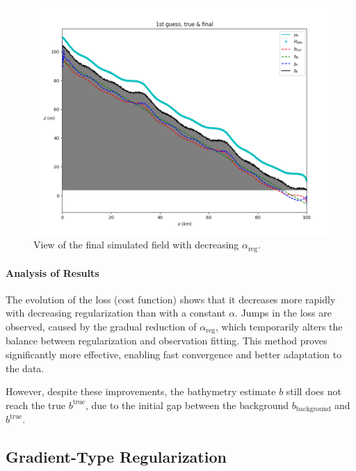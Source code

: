 \documentclass{article}
\begin{document}
\begin{figure}[H]
    \vspace{0.5cm}
    
    \begin{minipage}[b]{0.8\linewidth}
        \centering
        \includegraphics[width=\linewidth]{Images_Ayoub/With_Regularisation/Decreasing_Alpha/Viwe.png}
        \caption{View of the final simulated field with decreasing \( \alpha_{\text{reg}} \).}
        \label{fig:dec-view}
    \end{minipage}
\end{figure}

\paragraph{Analysis of Results}
The evolution of the loss (cost function) shows that it decreases more rapidly with decreasing regularization than with a constant \( \alpha \). Jumps in the loss are observed, caused by the gradual reduction of \( \alpha_{\text{reg}} \), which temporarily alters the balance between regularization and observation fitting. This method proves significantly more effective, enabling fast convergence and better adaptation to the data.

However, despite these improvements, the bathymetry estimate \( b \) still does not reach the true \( b^{\text{true}} \), due to the initial gap between the background \( b_{\text{background}} \) and \( b^{\text{true}} \).

\subsection{Gradient-Type Regularization}
\end{document}
